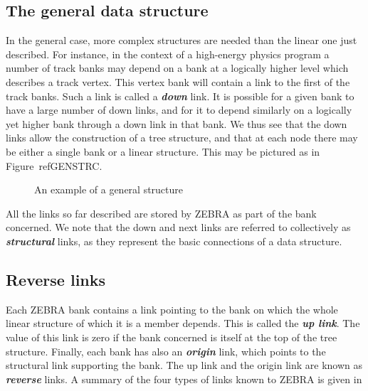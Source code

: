 \subsection{The general data structure}
\par
In the general case, more complex structures are needed than the linear
one just described. For instance, in the context of a high-energy
physics program a number of track banks may depend on a bank at a
logically higher level which
describes a track vertex. This vertex bank will
contain a link to the first of the track banks. Such a link is called a
{\bf\it down} link.
It is possible for a given bank to have a large number of
down links, and for it to depend similarly on a logically yet higher bank
through a down link in that bank.
We thus see that the down links allow the construction of
a tree structure, and that at each node there may be either a
single bank or a linear structure. This may be pictured as in
Figure~ref{GENSTRC}.
\begin{figure}%
\caption{An example of a general structure}
\label{GENSTRC}
\end{figure}
All the links so far described are stored by ZEBRA as part of the bank
concerned. We note that the down and next links are referred to collectively
as {\bf\it structural} links, as they represent the basic connections
of a data structure.
\subsection{Reverse links}
\par
Each ZEBRA bank contains a link pointing to the bank on which the
whole linear structure of which it is a member depends. This is called
the {\bf\it up link}. The value of
this link is zero if the bank concerned is itself at the top of the tree
structure.
Finally, each bank has also an {\bf\it origin} link, which points
to the structural link supporting the bank.
The up link and the origin link are
known as {\bf\it reverse} links.
A summary of the four types of links known to ZEBRA is given in

